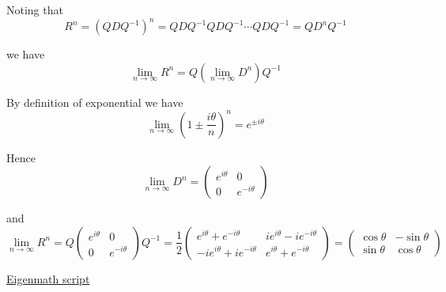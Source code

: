 Noting that
\begin{equation*}
R^n=\left(QDQ^{-1}\right)^n
=QDQ^{-1}QDQ^{-1}\cdots QDQ^{-1}
=QD^nQ^{-1}
\end{equation*}

we have
\begin{equation*}
\lim_{n\rightarrow\infty}R^n=Q\left(\lim_{n\rightarrow\infty}D^n\right)Q^{-1}
\end{equation*}

By definition of exponential we have
\begin{equation*}
\lim_{n\rightarrow\infty}\left(1\pm\frac{i\theta}{n}\right)^n=e^{\pm i\theta}
\end{equation*}

Hence
\begin{equation*}
\lim_{n\rightarrow\infty}D^n=
\begin{pmatrix}
e^{i\theta} & 0
\\
0 & e^{-i\theta}
\end{pmatrix}
\end{equation*}

and
\begin{equation*}
\lim_{n\rightarrow\infty}R^n
=Q
\begin{pmatrix}
e^{i\theta} & 0
\\
0 & e^{-i\theta}
\end{pmatrix}
Q^{-1}
=\frac{1}{2}\begin{pmatrix}
e^{i\theta}+e^{-i\theta} & ie^{i\theta}-ie^{-i\theta}
\\
-ie^{i\theta}+ie^{-i\theta} & e^{i\theta}+e^{-i\theta}
\end{pmatrix}
=\begin{pmatrix}
\cos\theta & -\sin\theta
\\
\sin\theta & \cos\theta
\end{pmatrix}
\tag{1}
\end{equation*}

\href{https://georgeweigt.github.io/examples/rotation-operator-part-2-demo.html}{Eigenmath script}


